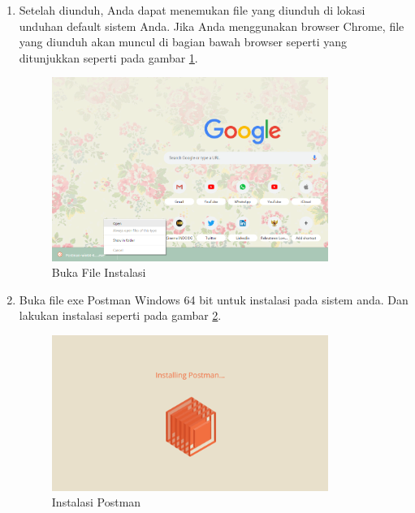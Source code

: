 \begin{enumerate}
\item Setelah diunduh, Anda dapat menemukan file yang diunduh di lokasi unduhan default sistem Anda. Jika Anda menggunakan browser Chrome, file yang diunduh akan muncul di bagian bawah browser seperti yang ditunjukkan seperti pada gambar \ref{fig:bfi}.
\begin{figure}[!htbp]
	\centerline{\includegraphics[width=0.85\textwidth]{figures/11/bfi.PNG}}
	\caption{Buka File Instalasi}
	\label{fig:bfi}
\end{figure}

\item Buka file exe Postman Windows 64 bit untuk instalasi pada sistem anda. Dan lakukan instalasi seperti pada gambar \ref{fig:ip}.
\begin{figure}[!htbp]
	\centerline{\includegraphics[width=0.85\textwidth]{figures/11/ip.PNG}}
	\caption{Instalasi Postman}
	\label{fig:ip}
\end{figure}


\end{enumerate}

